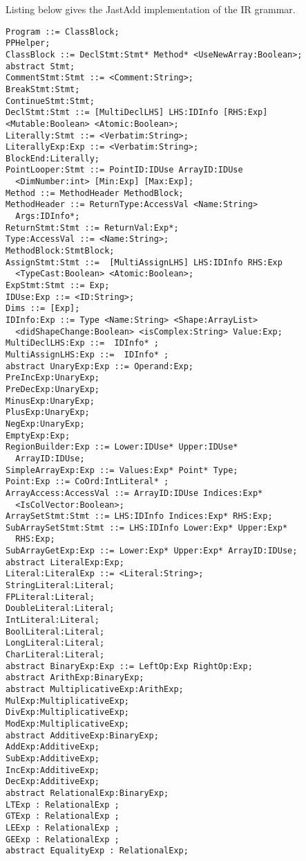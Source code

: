 Listing below gives the JastAdd implementation of the \mixten IR
grammar.

\begin{lstlisting}
Program ::= ClassBlock;
PPHelper;
ClassBlock ::= DeclStmt:Stmt* Method* <UseNewArray:Boolean>;
abstract Stmt;
CommentStmt:Stmt ::= <Comment:String>;
BreakStmt:Stmt;
ContinueStmt:Stmt;
DeclStmt:Stmt ::= [MultiDeclLHS] LHS:IDInfo [RHS:Exp]
<Mutable:Boolean> <Atomic:Boolean>;
Literally:Stmt ::= <Verbatim:String>;
LiterallyExp:Exp ::= <Verbatim:String>;
BlockEnd:Literally;
PointLooper:Stmt ::= PointID:IDUse ArrayID:IDUse
  <DimNumber:int> [Min:Exp] [Max:Exp];
Method ::= MethodHeader MethodBlock;
MethodHeader ::= ReturnType:AccessVal <Name:String>
  Args:IDInfo*;
ReturnStmt:Stmt ::= ReturnVal:Exp*;
Type:AccessVal ::= <Name:String>;
MethodBlock:StmtBlock;
AssignStmt:Stmt ::=  [MultiAssignLHS] LHS:IDInfo RHS:Exp
  <TypeCast:Boolean> <Atomic:Boolean>;
ExpStmt:Stmt ::= Exp;
IDUse:Exp ::= <ID:String>;
Dims ::= [Exp];
IDInfo:Exp ::= Type <Name:String> <Shape:ArrayList>
  <didShapeChange:Boolean> <isComplex:String> Value:Exp;
MultiDeclLHS:Exp ::=  IDInfo* ;
MultiAssignLHS:Exp ::=  IDInfo* ;
abstract UnaryExp:Exp ::= Operand:Exp;
PreIncExp:UnaryExp;
PreDecExp:UnaryExp;
MinusExp:UnaryExp;
PlusExp:UnaryExp;
NegExp:UnaryExp;
EmptyExp:Exp;
RegionBuilder:Exp ::= Lower:IDUse* Upper:IDUse*
  ArrayID:IDUse;
SimpleArrayExp:Exp ::= Values:Exp* Point* Type;
Point:Exp ::= CoOrd:IntLiteral* ;
ArrayAccess:AccessVal ::= ArrayID:IDUse Indices:Exp*
  <IsColVector:Boolean>;
ArraySetStmt:Stmt ::= LHS:IDInfo Indices:Exp* RHS:Exp;
SubArraySetStmt:Stmt ::= LHS:IDInfo Lower:Exp* Upper:Exp*
  RHS:Exp;
SubArrayGetExp:Exp ::= Lower:Exp* Upper:Exp* ArrayID:IDUse;
abstract LiteralExp:Exp;
Literal:LiteralExp ::= <Literal:String>;
StringLiteral:Literal;
FPLiteral:Literal;
DoubleLiteral:Literal;
IntLiteral:Literal;
BoolLiteral:Literal;
LongLiteral:Literal;
CharLiteral:Literal;
abstract BinaryExp:Exp ::= LeftOp:Exp RightOp:Exp;
abstract ArithExp:BinaryExp;
abstract MultiplicativeExp:ArithExp;
MulExp:MultiplicativeExp;
DivExp:MultiplicativeExp;
ModExp:MultiplicativeExp;
abstract AdditiveExp:BinaryExp;
AddExp:AdditiveExp;
SubExp:AdditiveExp;
IncExp:AdditiveExp; 
DecExp:AdditiveExp;
abstract RelationalExp:BinaryExp;
LTExp : RelationalExp ;                                                       
GTExp : RelationalExp ;                                                       
LEExp : RelationalExp ;                                                       
GEExp : RelationalExp ;  
abstract EqualityExp : RelationalExp;                                         

\end{lstlisting}
